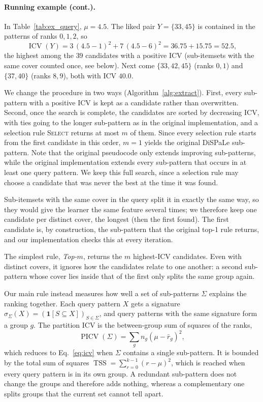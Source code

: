 \documentclass[sigconf]{acmart}
\newcommand{\ICV}{\operatorname{ICV}}
\newcommand{\PICV}{\operatorname{PICV}}
\newcommand{\TSS}{\operatorname{TSS}}
\begin{document}
\paragraph{Running example (cont.).}
In Table~\ref{tab:ex_query}, $\mu=4.5$. The liked pair $Y=\{33,45\}$ is contained in the patterns of ranks $0,1,2$, so
\begin{equation*}
 \ICV(Y)=3\,(4.5-1)^2+7\,(4.5-6)^2=36.75+15.75=52.5,
\end{equation*}
the highest among the $39$ candidates with a positive ICV (sub-itemsets with the same cover counted once, see below). Next come $\{33,42,45\}$ (ranks $0,1$) and $\{37,40\}$ (ranks $8,9$), both with ICV $40.0$.

We change the procedure in two ways (Algorithm~\ref{alg:extract}). First, every sub-pattern with a positive ICV is kept as a candidate rather than overwritten. Second, once the search is complete, the candidates are sorted by decreasing ICV, with ties going to the longer sub-pattern as in the original implementation, and a selection rule \textsc{Select} returns at most $m$ of them. Since every selection rule starts from the first candidate in this order, $m=1$ yields the original DiSPaLe sub-pattern. Note that the original pseudocode only extends improving sub-patterns, while the original implementation extends every sub-pattern that occurs in at least one query pattern. We keep this full search, since a selection rule may choose a candidate that was never the best at the time it was found.

Sub-itemsets with the same cover in the query split it in exactly the same way, so they would give the learner the same feature several times; we therefore keep one candidate per distinct cover, the longest (then the first found). The first candidate is, by construction, the sub-pattern that the original top-1 rule returns, and our implementation checks this at every iteration.

The simplest rule, \emph{Top-$m$}, returns the $m$ highest-ICV candidates. Even with distinct covers, it ignores how the candidates relate to one another: a second sub-pattern whose cover lies inside that of the first only splits the same group again.

Our main rule instead measures how well a set of sub-patterns $\Sigma$ explains the ranking together. Each query pattern $X$ gets a signature $\sigma_\Sigma(X)=(\mathbf{1}[S\subseteq X])_{S\in\Sigma}$, and query patterns with the same signature form a group $g$. The partition ICV is the between-group sum of squares of the ranks,
\begin{equation}\label{eq:picv}
\PICV(\Sigma)=\sum_g n_g(\mu-\bar r_g)^2,
\end{equation}
which reduces to Eq.~\eqref{eq:icv} when $\Sigma$ contains a single sub-pattern. It is bounded by the total sum of squares $\TSS=\sum_{r=0}^{k-1}(r-\mu)^2$, which is reached when every query pattern is in its own group. A redundant sub-pattern does not change the groups and therefore adds nothing, whereas a complementary one splits groups that the current set cannot tell apart.
\end{document}
